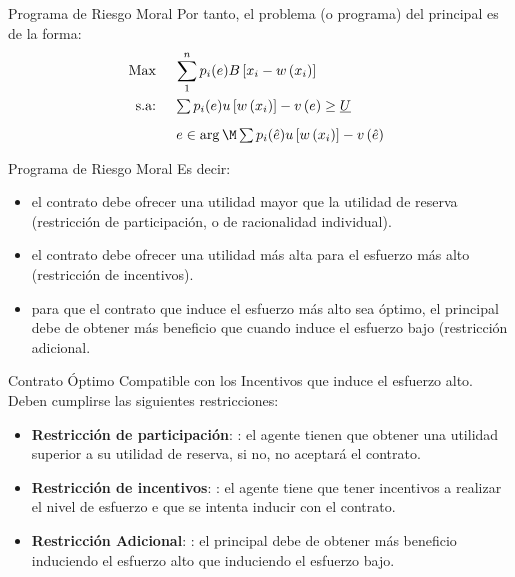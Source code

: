 \begin{frame}{Programa de Riesgo Moral}
	Por tanto, el problema (o programa) del principal es de la forma:
		\begin{align*}
			& \text{Max } \quad \sum_{1}^{n}p_i(e)B\left[x_i - w\left( x_i\right) \right] \\
			& \begin{array}{ll}
				\text{s.a: } & \sum p_i(e) u\left[ w\left( x_i\right) \right] - v\left( e \right) \geq \underline{U}\\[0.3cm]
							 & e \in \arg \M \sum p_i(\hat{e})u\left[ w\left( x_i\right) \right] - v\left( \hat{e}\right)
			\end{array}
		\end{align*}
\end{frame}
\begin{frame}{Programa de Riesgo Moral}
	Es decir:
		\begin{itemize}
			\item el contrato debe ofrecer una utilidad mayor que la utilidad de reserva (restricción de participación, o de racionalidad individual).
			\item el contrato debe ofrecer una utilidad más alta para el esfuerzo más alto (restricción de incentivos).
			\item para que el contrato que induce el esfuerzo más alto sea óptimo, el principal debe de obtener más beneficio que cuando induce el esfuerzo bajo (restricción adicional.
		\end{itemize}
\end{frame}
\begin{frame}{Contrato Óptimo Compatible con los Incentivos que induce el esfuerzo alto.}
	Deben cumplirse las siguientes restricciones:
		\begin{itemize}
			\item \textbf{Restricción de participación}: : el agente tienen que obtener una utilidad superior a su utilidad de reserva, si no, no aceptará el contrato.
			\item \textbf{Restricción de incentivos}: : el agente tiene que tener incentivos a realizar el nivel de esfuerzo e que se intenta inducir con el contrato.
			\item \textbf{Restricción Adicional}: : el principal debe de obtener más beneficio induciendo el esfuerzo alto que induciendo el esfuerzo bajo.
		\end{itemize}
\end{frame}
